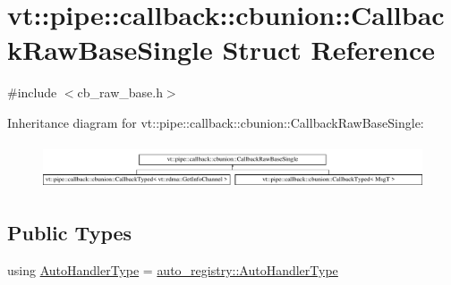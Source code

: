 \hypertarget{structvt_1_1pipe_1_1callback_1_1cbunion_1_1_callback_raw_base_single}{}\section{vt\+:\+:pipe\+:\+:callback\+:\+:cbunion\+:\+:Callback\+Raw\+Base\+Single Struct Reference}
\label{structvt_1_1pipe_1_1callback_1_1cbunion_1_1_callback_raw_base_single}


{\ttfamily \#include $<$cb\+\_\+raw\+\_\+base.\+h$>$}

Inheritance diagram for vt\+:\+:pipe\+:\+:callback\+:\+:cbunion\+:\+:Callback\+Raw\+Base\+Single\+:\begin{figure}[H]
\begin{center}
\leavevmode
\includegraphics[height=1.349398cm]{structvt_1_1pipe_1_1callback_1_1cbunion_1_1_callback_raw_base_single}
\end{center}
\end{figure}
\subsection*{Public Types}
\begin{DoxyCompactItemize}
\item 
using \hyperlink{structvt_1_1pipe_1_1callback_1_1cbunion_1_1_callback_raw_base_single_a734a9c83099de5bc1cd85f9da8dba7bb}{Auto\+Handler\+Type} = \hyperlink{namespacevt_1_1auto__registry_ae295e18699146815bb7d7674594d95d7}{auto\+\_\+registry\+::\+Auto\+Handler\+Type}
\end{DoxyCompactItemize}
